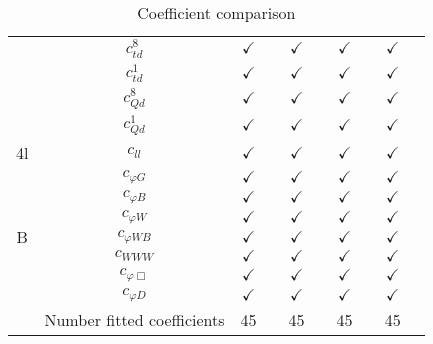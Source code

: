 \documentclass{article}
\begin{document}
\begin{table}[H]
\begin{tabular}{|c|c|c|c|c|c|c|c|c|c|}
 & $c_{td}^{8}$ & $\checkmark$ &  & $\checkmark$ &  & $\checkmark$ &  & $\checkmark$ & \\ \cline{2-10}
 & $c_{td}^{1}$ & $\checkmark$ &  & $\checkmark$ &  & $\checkmark$ &  & $\checkmark$ & \\ \cline{2-10}
 & $c_{Qd}^{8}$ & $\checkmark$ &  & $\checkmark$ &  & $\checkmark$ &  & $\checkmark$ & \\ \cline{2-10}
 & $c_{Qd}^{1}$ & $\checkmark$ &  & $\checkmark$ &  & $\checkmark$ &  & $\checkmark$ &
\\ \hline
\multirow{1}{*}{4l}
 & $c_{ll}$ & $\checkmark$ &  & $\checkmark$ &  & $\checkmark$ &  & $\checkmark$ &
\\ \hline
\multirow{7}{*}{B}
 & $c_{\varphi G}$ & $\checkmark$ &  & $\checkmark$ &  & $\checkmark$ &  & $\checkmark$ & \\ \cline{2-10}
 & $c_{\varphi B}$ & $\checkmark$ &  & $\checkmark$ &  & $\checkmark$ &  & $\checkmark$ & \\ \cline{2-10}
 & $c_{\varphi W}$ & $\checkmark$ &  & $\checkmark$ &  & $\checkmark$ &  & $\checkmark$ & \\ \cline{2-10}
 & $c_{\varphi WB}$ & $\checkmark$ &  & $\checkmark$ &  & $\checkmark$ &  & $\checkmark$ & \\ \cline{2-10}
 & $c_{WWW}$ & $\checkmark$ &  & $\checkmark$ &  & $\checkmark$ &  & $\checkmark$ & \\ \cline{2-10}
 & $c_{\varphi \Box}$ & $\checkmark$ &  & $\checkmark$ &  & $\checkmark$ &  & $\checkmark$ & \\ \cline{2-10}
 & $c_{\varphi D}$ & $\checkmark$ &  & $\checkmark$ &  & $\checkmark$ &  & $\checkmark$ &
\\ \hline
\hline & Number fitted coefficients & 45 &  & 45 &  & 45 &  & 45 &  \\ \hline
\end{tabular}
\caption{Coefficient comparison}
\end{table}
\end{document}
